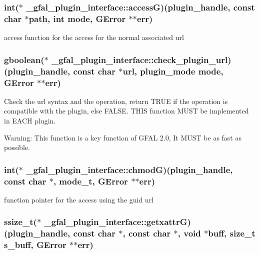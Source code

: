 \subsubsection{\setlength{\rightskip}{0pt plus 5cm}int($\ast$ \bf{\_\-gfal\_\-plugin\_\-interface::access\-G})(plugin\_\-handle, const char $\ast$path, int mode, GError $\ast$$\ast$err)}\label{struct__gfal__plugin__interface_1fa81d7a219629281c14b05116d32202}


access function for the access for the normal associated url 
\subsubsection{\setlength{\rightskip}{0pt plus 5cm}gboolean($\ast$ \bf{\_\-gfal\_\-plugin\_\-interface::check\_\-plugin\_\-url})(plugin\_\-handle, const char $\ast$url, plugin\_\-mode mode, GError $\ast$$\ast$err)}\label{struct__gfal__plugin__interface_e1ab2d2c3ea35095446a2c14734b5f4c}


Check the url syntax and the operation, return TRUE if the operation is compatible with the plugin, else FALSE. THIS function MUST be implemented in EACH plugin. \begin{Desc}
\item[Warning:]This function is a key function of GFAL 2.0, It MUST be as fast as possible. \end{Desc}
\subsubsection{\setlength{\rightskip}{0pt plus 5cm}int($\ast$ \bf{\_\-gfal\_\-plugin\_\-interface::chmod\-G})(plugin\_\-handle, const char $\ast$, mode\_\-t, GError $\ast$$\ast$err)}\label{struct__gfal__plugin__interface_e032ec6f13423ea516ca4c02332f5ecf}


function pointer for the access using the guid url 
\subsubsection{\setlength{\rightskip}{0pt plus 5cm}ssize\_\-t($\ast$ \bf{\_\-gfal\_\-plugin\_\-interface::getxattr\-G})(plugin\_\-handle, const char $\ast$, const char $\ast$, void $\ast$buff, size\_\-t s\_\-buff, GError $\ast$$\ast$err)}\label{struct__gfal__plugin__interface_9c6b4405f17d92e42aa40ff307188701}


